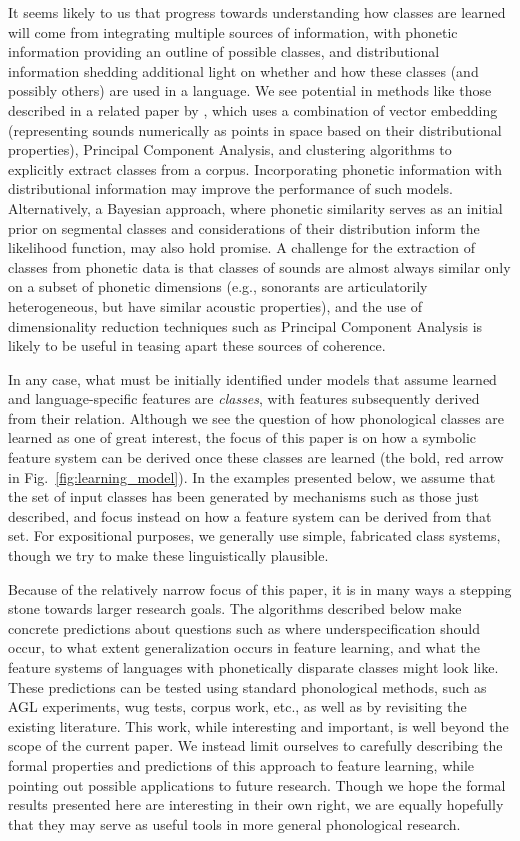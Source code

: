 \documentclass[12pt, oneside]{article}   	%
\begin{document}
It seems likely to us that progress towards understanding how classes are learned will come from integrating multiple sources of information, with phonetic information providing an outline of possible classes, and distributional information shedding additional light on whether and how these classes (and possibly others) are used in a language. We see potential in methods like those described in a related paper by , which uses a combination of vector embedding (representing sounds numerically as points in space based on their distributional properties), Principal Component Analysis, and clustering algorithms to explicitly extract classes from a corpus. Incorporating phonetic information with distributional information may improve the performance of such models. Alternatively, a Bayesian approach, where phonetic similarity serves as an initial prior on segmental classes and considerations of their distribution inform the likelihood function, may also hold promise. A challenge for the extraction of classes from phonetic data is that classes of sounds are almost always similar only on a subset of phonetic dimensions (e.g., sonorants are articulatorily heterogeneous, but have similar acoustic properties), and the use of dimensionality reduction techniques such as Principal Component Analysis is likely to be useful in teasing apart these sources of coherence.

In any case, what must be initially identified under models that assume learned and language-specific features are \textit{classes}, with features subsequently derived from their relation. Although we see the question of how phonological classes are learned as one of great interest, the focus of this paper is on how a symbolic feature system can be derived once these classes are learned (the bold, red arrow in Fig.~\ref{fig:learning_model}). In the examples presented below, we assume that the set of input classes has been generated by mechanisms such as those just described, and focus instead on how a feature system can be derived from that set. For expositional purposes, we generally use simple, fabricated class systems, though we try to make these linguistically plausible.

Because of the relatively narrow focus of this paper, it is in many ways a stepping stone towards larger research goals. The algorithms described below make concrete predictions about questions such as where underspecification should occur, to what extent generalization occurs in feature learning, and what the feature systems of languages with phonetically disparate classes might look like. These predictions can be tested using standard phonological methods, such as AGL experiments, wug tests, corpus work, etc., as well as by revisiting the existing literature. This work, while interesting and important, is well beyond the scope of the current paper. We instead limit ourselves to carefully describing the formal properties and predictions of this approach to feature learning, while pointing out possible applications to future research. Though we hope the formal results presented here are interesting in their own right, we are equally hopefully that they may serve as useful tools in more general phonological research.
\end{document}
